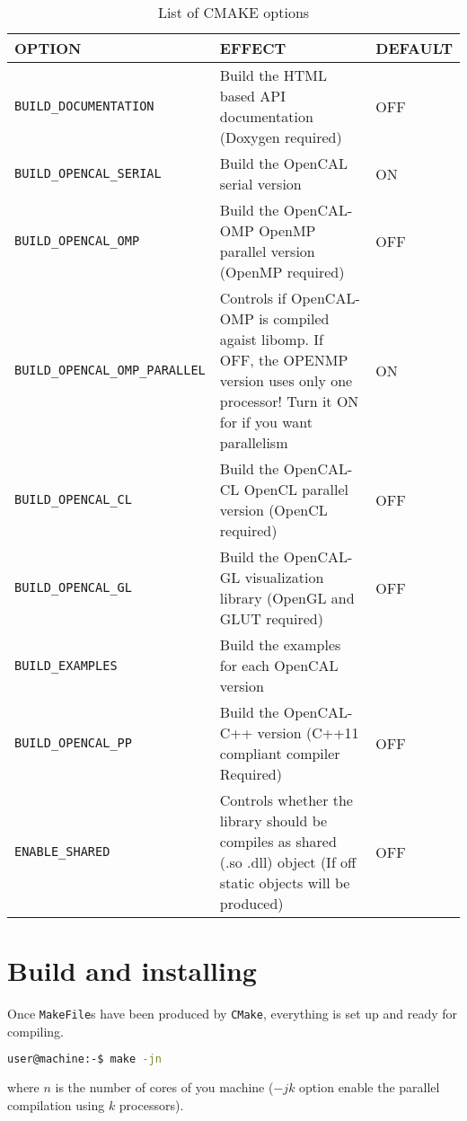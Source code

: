\begin{table}[]
\centering
\caption{List of CMAKE options}
\label{ch:installation:cmakeoptions}
\begin{tabularx}{\textwidth}{|l|X|l|}
\hline
\textbf{OPTION} & \textbf{EFFECT} & \textbf{DEFAULT}\\ \hline
   \texttt{BUILD\_DOCUMENTATION}  &  Build the HTML based API documentation (Doxygen required)  & OFF   \\ \hline
  \texttt{BUILD\_OPENCAL\_SERIAL} & Build the OpenCAL serial version  & ON   \\ \hline
   \texttt{BUILD\_OPENCAL\_OMP} &  Build the OpenCAL-OMP OpenMP parallel version (OpenMP required)    & OFF \\ \hline
   \texttt{BUILD\_OPENCAL\_OMP\_PARALLEL} &  Controls if OpenCAL-OMP is compiled agaist libomp. If OFF, the OPENMP version uses only one processor! Turn it ON for if you want parallelism  &  ON  \\ \hline
   \texttt{BUILD\_OPENCAL\_CL} &  Build the OpenCAL-CL OpenCL parallel version (OpenCL required)     &OFF\\ \hline
   \texttt{BUILD\_OPENCAL\_GL} & Build the OpenCAL-GL visualization library (OpenGL and GLUT required)      &OFF \\ \hline                          
   \texttt{BUILD\_EXAMPLES} & Build the examples for each OpenCAL version      &\\ \hline
   \texttt{BUILD\_OPENCAL\_PP} &  Build the OpenCAL-C++ version (C++11 compliant compiler Required)    &  OFF\\ \hline
   \texttt{ENABLE\_SHARED} &  Controls whether the library should be compiles as shared  (.so .dll) object (If off static objects will be produced) & OFF\\ \hline                        
\end{tabularx}
\end{table}


\section{Build and installing}
Once \texttt{MakeFile}s have been produced by \texttt{CMake}, everything is set up and ready for compiling. 

\begin{lstlisting}[language=bash,caption={OpenCAL build},label={ch:quickstart:ebuild}]
user@machine:-$ make -jn
\end{lstlisting}
where $n$ is the number of cores of you machine ($-jk$ option enable the parallel compilation using $k$ processors).

